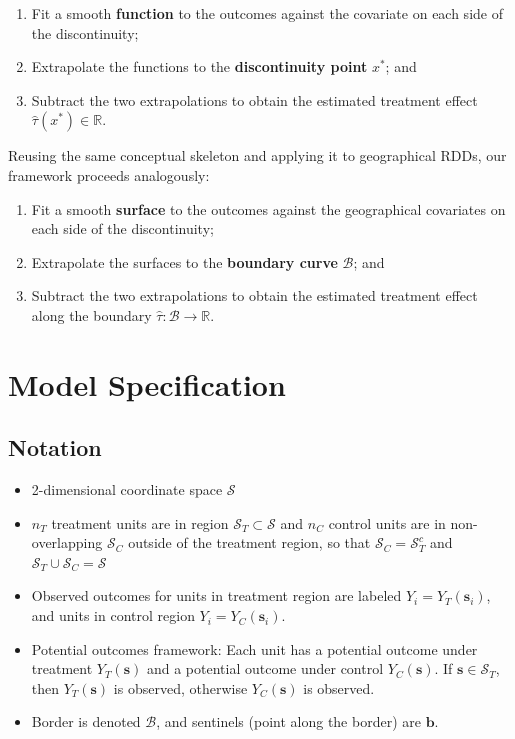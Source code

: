 \documentclass[letter]{article}
\providecommand{\tightlist}{%
      \setlength{\itemsep}{0pt}\setlength{\parskip}{0pt}}
\newcommand{\scrS}{\mathscr{S}}
\newcommand{\svec}{\mathbold{s}}
\newcommand{\boundary}{\mathcal{B}}
\newcommand{\sentinels}{\bm{b}}
\providecommand{\tightlist}{%
  	  \setlength{\itemsep}{0pt}\setlength{\parskip}{0pt}}
\begin{document}
\begin{enumerate}
\def\labelenumi{\arabic{enumi}.}
\tightlist
\item
  Fit a smooth \textbf{function} to the outcomes against the covariate on each side of the discontinuity;
\item
  Extrapolate the functions to the \textbf{discontinuity point} \(x^*\); and
\item
  Subtract the two extrapolations to obtain the estimated treatment effect \(\hat\tau(x^*) \in \mathbb{R}\).
\end{enumerate}

Reusing the same conceptual skeleton and applying it to geographical RDDs, our framework proceeds analogously:

\begin{enumerate}
\def\labelenumi{\arabic{enumi}.}
\tightlist
\item
  Fit a smooth \textbf{surface} to the outcomes against the geographical covariates on each side of the discontinuity;
\item
  Extrapolate the surfaces to the \textbf{boundary curve} \(\boundary\); and
\item
  Subtract the two extrapolations to obtain the estimated treatment effect along the boundary \(\hat\tau: \boundary \rightarrow \mathbb{R}\).
\end{enumerate}
    


    	\section{Model Specification}\label{model-specification}

\subsection{Notation}\label{notation}

\begin{itemize}
\tightlist
\item
  2-dimensional coordinate space \(\scrS\)
\item
  \(n_T\) treatment units are in region \(\scrS_T \subset \scrS\) and \(n_C\) control units are in non-overlapping \(\scrS_C\) outside of the treatment region, so that \(\scrS_C = \scrS_T^c\) and \(\scrS_T \cup \scrS_C = \scrS\)
\item
  Observed outcomes for units in treatment region are labeled \(Y_i = Y_T(\svec_i)\), and units in control region \(Y_i = Y_C(\svec_i)\).
\item
  Potential outcomes framework: Each unit has a potential outcome under treatment \(Y_T(\svec)\) and a potential outcome under control \(Y_C(\svec)\). If \(\svec \in \scrS_T\), then \(Y_T(\svec)\) is observed, otherwise \(Y_C(\svec)\) is observed.
\item
  Border is denoted \(\boundary\), and sentinels (point along the border) are \(\sentinels\).
\end{itemize}
\end{document}
